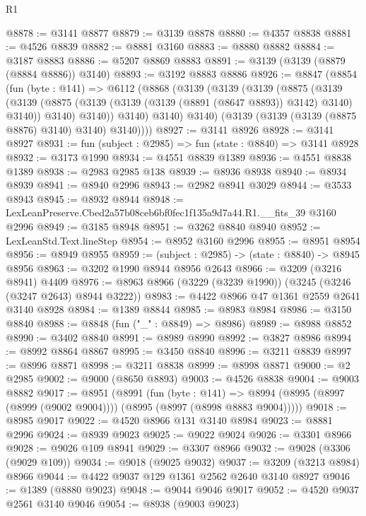 \begin{lexlean}{R1}
\begin{coremodule}
@8878 := @3141 @8877
@8879 := @3139 @8878
@8880 := @4357 @8838
@8881 := @4526 @8839
@8882 := @8881 @3160
@8883 := @8880 @8882
@8884 := @3187 @8883
@8886 := @5207 @8869 @8883
@8891 := @3139 (@3139 (@8879 (@8884 @8886)) @3140)
@8893 := @3192 @8883 @8886
@8926 := @8847
    (@8854
      (fun (byte : @141) =>
      @6112
        (@8868
          (@3139
            (@3139
              (@3139
                (@8875
                  (@3139
                    (@3139
                      (@8875 (@3139 (@3139 (@3139 (@8891 (@8647 @8893)) @3142) @3140) @3140))
                      @3140)
                    @3140))
                @3140)
              @3140)
            @3140)
          (@3139 (@3139 (@3139 (@8875 @8876) @3140) @3140) @3140))))
@8927 := @3141 @8926
@8928 := @3141 @8927
@8931 := fun (subject : @2985) => fun (state : @8840) => @3141 @8928
@8932 := @3173 @1990
@8934 := @4551 @8839 @1389
@8936 := @4551 @8838 @1389
@8938 := @2983 @2985 @138
@8939 := @8936 @8938
@8940 := @8934 @8939
@8941 := @8940 @2996
@8943 := @2982 @8941 @3029
@8944 := @3533 @8943
@8945 := @8932 @8944
@8948 := LexLeanPreserve.Cbed2a57b08ceb6bf0fec1f135a9d7a44.R1.__fits_39 @3160 @2996
@8949 := @3185 @8948
@8951 := @3262 @8840 @8940
@8952 := LexLeanStd.Text.lineStep
@8954 := @8952 @3160 @2996
@8955 := @8951 @8954
@8956 := @8949 @8955
@8959 := (subject : @2985) -> (state : @8840) -> @8945 @8956
@8963 := @3202 @1990 @8944 @8956 @2643
@8966 := @3209 (@3216 @8941) @4409
@8976 := @8963 @8966 (@3229 (@3239 @1990)) (@3245 (@3246 (@3247 @2643) @8944 @3222))
@8983 := @4422 @8966 @47 @1361 @2559 @2641 @3140 @8928
@8984 := @1389 @8844
@8985 := @8983 @8984
@8986 := @3150 @8840
@8988 := @8848 (fun ("_" : @8849) => @8986)
@8989 := @8988 @8852
@8990 := @3402 @8840
@8991 := @8989 @8990
@8992 := @3827 @8986
@8994 := @8992 @8864 @8867
@8995 := @3450 @8840
@8996 := @3211 @8839
@8997 := @8996 @8871
@8998 := @3211 @8838
@8999 := @8998 @8871
@9000 := @2 @2985
@9002 := @9000 (@8650 @8893)
@9003 := @4526 @8838
@9004 := @9003 @8882
@9017 := @8951
    (@8991
      (fun (byte : @141) =>
      @8994 (@8995 (@8997 (@8999 (@9002 @9004)))) (@8995 (@8997 (@8998 @8883 @9004)))))
@9018 := @8985 @9017
@9022 := @4520 @8966 @131 @3140 @8984
@9023 := @8881 @2996
@9024 := @8939 @9023
@9025 := @9022 @9024
@9026 := @3301 @8966
@9028 := @9026 @109 @8941
@9029 := @3307 @8966
@9032 := @9028 (@3306 (@9029 @109))
@9034 := @9018 (@9025 @9032)
@9037 := @3209 (@3213 @8984) @8966
@9044 := @4422 @9037 @129 @1361 @2562 @2640 @3140 @8927
@9046 := @1389 (@8880 @9023)
@9048 := @9044 @9046 @9017
@9052 := @4520 @9037 @2561 @3140 @9046
@9054 := @8938 (@9003 @9023)

\end{coremodule}
\end{lexlean}
